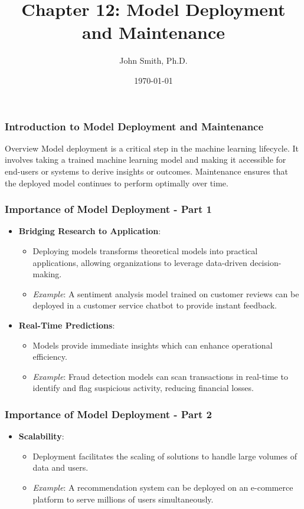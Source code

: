 \documentclass[aspectratio=169]{beamer}
\title[Model Deployment and Maintenance]{Chapter 12: Model Deployment and Maintenance}
\author[J. Smith]{John Smith, Ph.D.}
\institute[University Name]{
  Department of Computer Science\\
  University Name\\
  \vspace{0.3cm}
  Email: email@university.edu\\
  Website: www.university.edu
}
\date{\today}
\begin{document}
\frame{\titlepage}

\begin{frame}[fragile]
    \frametitle{Introduction to Model Deployment and Maintenance}
    \begin{block}{Overview}
        Model deployment is a critical step in the machine learning lifecycle. It involves taking a trained machine learning model and making it accessible for end-users or systems to derive insights or outcomes. Maintenance ensures that the deployed model continues to perform optimally over time.
    \end{block}
\end{frame}

\begin{frame}[fragile]
    \frametitle{Importance of Model Deployment - Part 1}
    \begin{itemize}
        \item \textbf{Bridging Research to Application}:
            \begin{itemize}
                \item Deploying models transforms theoretical models into practical applications, allowing organizations to leverage data-driven decision-making.
                \item \textit{Example}: A sentiment analysis model trained on customer reviews can be deployed in a customer service chatbot to provide instant feedback.
            \end{itemize}
        
        \item \textbf{Real-Time Predictions}:
            \begin{itemize}
                \item Models provide immediate insights which can enhance operational efficiency.
                \item \textit{Example}: Fraud detection models can scan transactions in real-time to identify and flag suspicious activity, reducing financial losses.
            \end{itemize}
    \end{itemize}
\end{frame}

\begin{frame}[fragile]
    \frametitle{Importance of Model Deployment - Part 2}
    \begin{itemize}
        \item \textbf{Scalability}:
            \begin{itemize}
                \item Deployment facilitates the scaling of solutions to handle large volumes of data and users.
                \item \textit{Example}: A recommendation system can be deployed on an e-commerce platform to serve millions of users simultaneously.
            \end{itemize}
    \end{itemize}
\end{frame}
\end{document}
